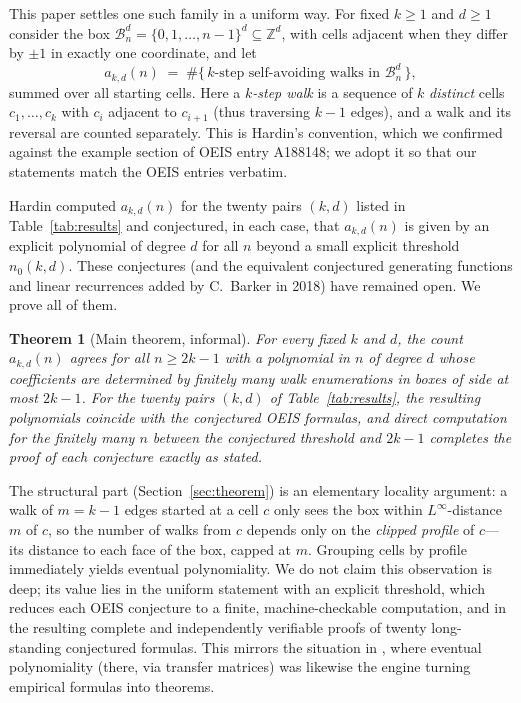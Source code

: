 \documentclass[11pt]{article}
\newtheorem{theorem}{Theorem}[section]
\newcommand{\ZZ}{\mathbb{Z}}
\newcommand{\GBox}{\mathcal{B}}
\begin{document}
This paper settles one such family in a uniform way.  For fixed $k \ge 1$
and $d \ge 1$ consider the box
$\GBox_n^d = \{0,1,\dots,n-1\}^d \subseteq \ZZ^d$, with cells adjacent when
they differ by $\pm 1$ in exactly one coordinate, and let
\[
  a_{k,d}(n) \;=\; \#\bigl\{\, k\text{-step self-avoiding walks in }
  \GBox_n^d \,\bigr\},
\]
summed over all starting cells.  Here a \emph{$k$-step walk} is a sequence
of $k$ \emph{distinct} cells $c_1,\dots,c_k$ with $c_i$ adjacent to
$c_{i+1}$ (thus traversing $k-1$ edges), and a walk and its reversal are counted
separately.  This is Hardin's convention, which we confirmed against the
example section of OEIS entry A188148; we adopt it so that our statements
match the OEIS entries verbatim.

Hardin computed $a_{k,d}(n)$ for the twenty pairs $(k,d)$ listed in
Table~\ref{tab:results} and conjectured, in each case, that $a_{k,d}(n)$
is given by an explicit polynomial of degree $d$ for all $n$ beyond a
small explicit threshold $n_0(k,d)$.  These conjectures (and the
equivalent conjectured generating functions and linear recurrences added
by C.~Barker in 2018) have remained open.  We prove all of them.

\begin{theorem}[Main theorem, informal]\label{thm:informal}
For every fixed $k$ and $d$, the count $a_{k,d}(n)$ agrees for all
$n \ge 2k-1$ with a polynomial in $n$ of degree $d$ whose coefficients
are determined by finitely many walk enumerations in boxes of side at
most $2k-1$.  For the twenty pairs $(k,d)$ of
Table~\ref{tab:results}, the resulting polynomials coincide with the
conjectured OEIS formulas, and direct computation for the finitely many
$n$ between the conjectured threshold and $2k-1$ completes the proof of
each conjecture exactly as stated.
\end{theorem}

The structural part (Section~\ref{sec:theorem}) is an elementary locality
argument: a walk of $m = k-1$ edges started at a cell $c$ only sees the
box within $L^\infty$-distance $m$ of $c$, so the number of walks from
$c$ depends only on the \emph{clipped profile} of $c$---its distance to
each face of the box, capped at $m$.  Grouping cells by profile
immediately yields eventual polynomiality.  We do not claim this
observation is deep; its value lies in the uniform statement with an
explicit threshold, which reduces each OEIS conjecture to a finite,
machine-checkable computation, and in the resulting complete and
independently verifiable proofs of twenty long-standing conjectured
formulas.  This mirrors the situation in \cite{DBK}, where eventual
polynomiality (there, via transfer matrices) was likewise the engine
turning empirical formulas into theorems.
\end{document}
